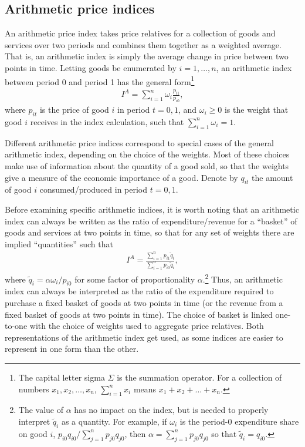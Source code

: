 \documentclass[]{article}
\begin{document}
\hypertarget{arithmetic-price-indices}{%
\subsection{Arithmetic price indices}\label{arithmetic-price-indices}}

An arithmetic price index takes price relatives for a collection of goods and services over two periods and combines them together as a weighted average. That is, an arithmetic index is simply the average change in price between two points in time. Letting goods be enumerated by \(i = 1,\ldots, n\), an arithmetic index between period 0 and period 1 has the general form\footnote{The capital letter sigma \(\Sigma\) is the summation operator. For a collection of numbers \(x_{1}, x_{2},\ldots,x_{n}\), \(\sum_{i=1}^{n} x_{i}\) means \(x_{1} + x_{2} + \ldots + x_{n}\).}
\begin{align*}
I^{A} = \sum_{i = 1}^{n} \omega_{i} \frac{p_{i1}}{p_{i0}},
\end{align*}
where \(p_{it}\) is the price of good \(i\) in period \(t = 0,1\), and \(\omega_{i} \geq 0\) is the weight that good \(i\) receives in the index calculation, such that \(\sum_{i = 1}^{n} \omega_{i} = 1\).

Different arithmetic price indices correspond to special cases of the general arithmetic index, depending on the choice of the weights. Most of these choices make use of information about the quantity of a good sold, so that the weights give a measure of the economic importance of a good. Denote by \(q_{it}\) the amount of good \(i\) consumed/produced in period \(t = 0,1\).

Before examining specific arithmetic indices, it is worth noting that an arithmetic index can always be written as the ratio of expenditure/revenue for a ``basket'' of goods and services at two points in time, so that for any set of weights there are implied ``quantities'' such that
\begin{align*}
I^{A} = \frac{\sum_{i = 1}^{n} p_{i1} \tilde{q}_{i}}{\sum_{i = 1}^{n} p_{i0} \tilde{q}_{i}},
\end{align*}
where \(\tilde{q}_{i} = \alpha \omega_{i} / p_{i0}\) for some factor of proportionality \(\alpha\).\footnote{The value of \(\alpha\) has no impact on the index, but is needed to properly interpret \(\tilde{q}_{i}\) as a quantity. For example, if \(\omega_{i}\) is the period-0 expenditure share on good \(i\), \(p_{i0} q_{i0} / \sum_{j = 1}^{n} p_{j0} q_{j0}\), then \(\alpha = \sum_{j = 1}^{n} p_{j0} q_{j0}\) so that \(\tilde{q}_{i} = q_{i0}\).} Thus, an arithmetic index can always be interpreted as the ratio of the expenditure required to purchase a fixed basket of goods at two points in time (or the revenue from a fixed basket of goods at two points in time). The choice of basket is linked one-to-one with the choice of weights used to aggregate price relatives. Both representations of the arithmetic index get used, as some indices are easier to represent in one form than the other.
\end{document}
